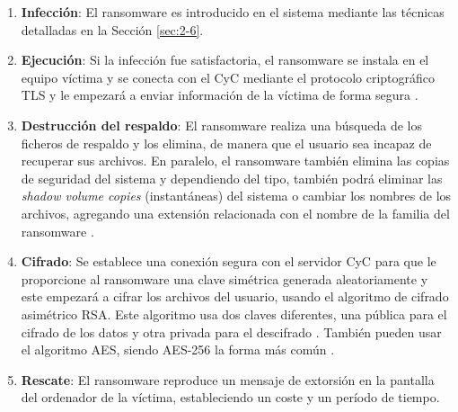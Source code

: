 \begin{enumerate}
    \item \textbf{Infección}: El ransomware es introducido en el sistema mediante las técnicas detalladas en la Sección \ref{sec:2-6}.
    
    \item \textbf{Ejecución}: Si la infección fue satisfactoria, el ransomware se instala en el equipo víctima y se conecta con el \gls{CyC} mediante el protocolo criptográfico \gls{TLS} y le empezará a enviar información de la víctima de forma segura \cite{35}.
    
    \item \textbf{Destrucción del respaldo}: El ransomware realiza una búsqueda de los ficheros de respaldo y los elimina, de manera que el usuario sea incapaz de recuperar sus archivos. En paralelo, el ransomware también elimina las copias de seguridad del sistema y dependiendo del tipo, también podrá eliminar las \textit{shadow volume copies} (instantáneas) del sistema o cambiar los nombres de los archivos, agregando una extensión relacionada con el nombre de la familia del ransomware \cite{29}. 
    
    \item \textbf{Cifrado}: Se establece una conexión segura con el servidor \gls{CyC} para que le proporcione al ransomware una clave simétrica generada aleatoriamente y este empezará a cifrar los archivos del usuario, usando el algoritmo de cifrado asimétrico \gls{RSA}. Este algoritmo usa dos claves diferentes, una pública para el cifrado de los datos y otra privada para el descifrado  \cite{36}. También pueden usar el algoritmo \gls{AES}, siendo \gls{AES}-256 la forma más común \cite{34}.
    
    \item \textbf{Rescate}: El ransomware reproduce un mensaje de extorsión en la pantalla del ordenador de la víctima, estableciendo un coste y un período de tiempo. 
\end{enumerate}

